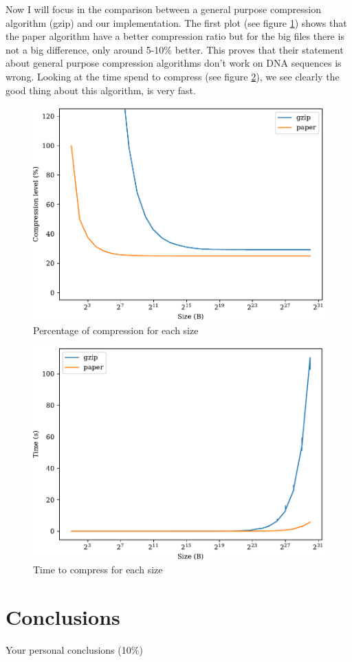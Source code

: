\documentclass[conference,a4paper]{IEEEtran}
\begin{document}
Now I will focus in the comparison between a general purpose compression algorithm (gzip) and our implementation. The first plot (see figure \ref{fig:compression}) shows that the paper algorithm have a better compression ratio but for the big files there is not a big difference, only around 5-10\% better. This proves that their statement about general purpose compression algorithms don't work on DNA sequences is wrong. Looking at the time spend to compress (see figure \ref{fig:time}), we see clearly the good thing about this algorithm, is very fast.

\begin{figure}[htbp]
    \centering
    \includegraphics[width=0.95\linewidth]{../plots/compression.pdf}
    \caption{Percentage of compression for each size}
    \label{fig:compression}
\end{figure}

\begin{figure}[htbp]
    \centering
    \includegraphics[width=0.95\linewidth]{../plots/time.pdf}
    \caption{Time to compress for each size}
    \label{fig:time}
\end{figure}


\section{Conclusions}
Your personal conclusions (10\%)



\end{document}
